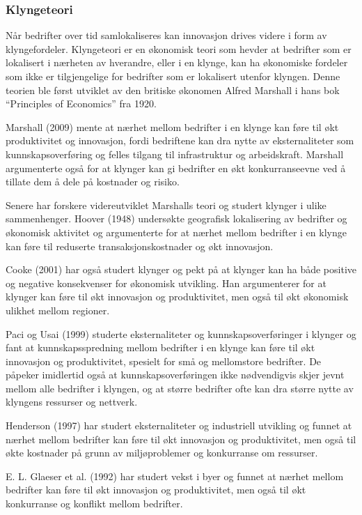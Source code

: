 \documentclass[
]{article}
\begin{document}
\hypertarget{klyngeteori}{%
\subsubsection{Klyngeteori}\label{klyngeteori}}

Når bedrifter over tid samlokaliseres kan innovasjon drives videre i
form av klyngefordeler. Klyngeteori er en økonomisk teori som hevder at
bedrifter som er lokalisert i nærheten av hverandre, eller i en klynge,
kan ha økonomiske fordeler som ikke er tilgjengelige for bedrifter som
er lokalisert utenfor klyngen. Denne teorien ble først utviklet av den
britiske økonomen Alfred Marshall i hans bok ``Principles of Economics''
fra 1920.

Marshall (2009) mente at nærhet mellom bedrifter i en klynge kan føre
til økt produktivitet og innovasjon, fordi bedriftene kan dra nytte av
eksternaliteter som kunnskapsoverføring og felles tilgang til
infrastruktur og arbeidskraft. Marshall argumenterte også for at klynger
kan gi bedrifter en økt konkurranseevne ved å tillate dem å dele på
kostnader og risiko.

Senere har forskere videreutviklet Marshalls teori og studert klynger i
ulike sammenhenger. Hoover (1948) undersøkte geografisk lokalisering av
bedrifter og økonomisk aktivitet og argumenterte for at nærhet mellom
bedrifter i en klynge kan føre til reduserte transaksjonskostnader og
økt innovasjon.

Cooke (2001) har også studert klynger og pekt på at klynger kan ha både
positive og negative konsekvenser for økonomisk utvikling. Han
argumenterer for at klynger kan føre til økt innovasjon og
produktivitet, men også til økt økonomisk ulikhet mellom regioner.

Paci og Usai (1999) studerte eksternaliteter og kunnskapsoverføringer i
klynger og fant at kunnskapsspredning mellom bedrifter i en klynge kan
føre til økt innovasjon og produktivitet, spesielt for små og
mellomstore bedrifter. De påpeker imidlertid også at
kunnskapsoverføringen ikke nødvendigvis skjer jevnt mellom alle
bedrifter i klyngen, og at større bedrifter ofte kan dra større nytte av
klyngens ressurser og nettverk.

Henderson (1997) har studert eksternaliteter og industriell utvikling og
funnet at nærhet mellom bedrifter kan føre til økt innovasjon og
produktivitet, men også til økte kostnader på grunn av miljøproblemer og
konkurranse om ressurser.

E. L. Glaeser et al. (1992) har studert vekst i byer og funnet at nærhet
mellom bedrifter kan føre til økt innovasjon og produktivitet, men også
til økt konkurranse og konflikt mellom bedrifter.
\end{document}
